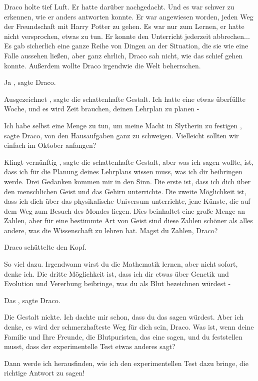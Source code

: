 Draco holte tief Luft. Er hatte darüber nachgedacht. Und es war schwer zu
erkennen, wie er anders antworten konnte. Er war angewiesen worden, jeden Weg
der Freundschaft mit Harry Potter zu gehen. Es war nur zum Lernen, er hatte
nicht versprochen, etwas zu tun. Er konnte den Unterricht jederzeit abbrechen...
Es gab sicherlich eine ganze Reihe von Dingen an der Situation, die sie wie eine
Falle aussehen ließen, aber ganz ehrlich, Draco sah nicht, wie das schief gehen
konnte. Außerdem wollte Draco irgendwie die Welt beherrschen.

\glqq Ja\grqq{} , sagte Draco.

\glqq Ausgezeichnet\grqq{} , sagte die schattenhafte Gestalt. \glqq Ich hatte
eine etwas überfüllte Woche, und es wird Zeit brauchen, deinen Lehrplan zu
planen -\grqq{}

\glqq Ich habe selbst eine Menge zu tun, um meine Macht in Slytherin zu
festigen\grqq{} , sagte Draco, \glqq von den Hausaufgaben ganz zu schweigen.
Vielleicht sollten wir einfach im Oktober anfangen?\grqq{}

\glqq Klingt vernünftig\grqq{} , sagte die schattenhafte Gestalt, \glqq aber was
ich sagen wollte, ist, dass ich für die Planung deines Lehrplans wissen muss,
was ich dir beibringen werde. Drei Gedanken kommen mir in den Sinn. Die erste
ist, dass ich dich über den menschlichen Geist und das Gehirn unterrichte. Die
zweite Möglichkeit ist, dass ich dich über das physikalische Universum
unterrichte, jene Künste, die auf dem Weg zum Besuch des Mondes liegen. Dies
beinhaltet eine große Menge an Zahlen, aber für eine bestimmte Art von Geist
sind diese Zahlen schöner als alles andere, was die Wissenschaft zu lehren hat.
Magst du Zahlen, Draco?\grqq{}

Draco schüttelte den Kopf.

\glqq So viel dazu. Irgendwann wirst du die Mathematik lernen, aber nicht
sofort, denke ich. Die dritte Möglichkeit ist, dass ich dir etwas über Genetik
und Evolution und Vererbung beibringe, was du als Blut bezeichnen würdest
-\grqq{}

\glqq Das\grqq{} , sagte Draco.

Die Gestalt nickte. \glqq Ich dachte mir schon, dass du das sagen würdest. Aber
ich denke, es wird der schmerzhafteste Weg für dich sein, Draco. Was ist, wenn
deine Familie und Ihre Freunde, die Blutpuristen, das eine sagen, und du
feststellen musst, dass der experimentelle Test etwas anderes sagt?\grqq{}

\glqq Dann werde ich herausfinden, wie ich den experimentellen Test dazu bringe,
die richtige Antwort zu sagen!\grqq{}

